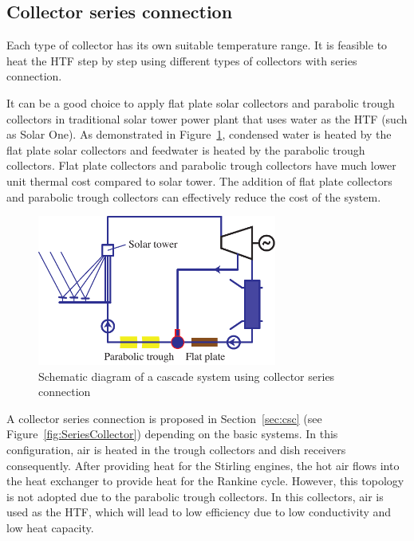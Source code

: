 \subsection{Collector series connection}
Each type of collector has its own suitable temperature range. It is feasible to heat the HTF step by step using different types of collectors with series connection.

It can be a good choice to apply flat plate solar collectors and parabolic trough collectors in traditional solar tower power plant that uses water as the HTF (such as Solar One). As demonstrated in Figure~\ref{fig:seriesCollection}, condensed water is heated by the flat plate solar collectors and feedwater is heated by the parabolic trough collectors. Flat plate collectors and parabolic trough collectors have much lower unit thermal cost compared to solar tower. The addition of flat plate collectors and parabolic trough collectors can effectively reduce the cost of the system.

\begin{figure}[!ht]
\centering 
\includegraphics[width=0.7\textwidth]{fig/SeriesCollection}
\caption{Schematic diagram of a cascade system using collector series connection}\label{fig:seriesCollection}
\end{figure}

A collector series connection is proposed in Section~\ref{sec:csc} (see Figure~\ref{fig:SeriesCollector}) depending on the basic systems. In this configuration, air is heated in the trough collectors and dish receivers consequently. After providing heat for the Stirling engines, the hot air flows into the heat exchanger to provide heat for the Rankine cycle. However, this topology is not adopted due to the parabolic trough collectors. In this collectors, air is used as the HTF, which will lead to low efficiency due to low conductivity and low heat capacity.

